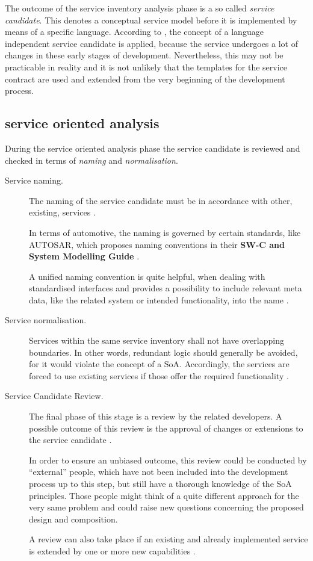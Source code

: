 The outcome of the service inventory analysis phase is a so called \emph{service candidate}. This denotes a conceptual service model before it is implemented by means of a specific language. According to \cite[p.42]{erl2011}, the concept of a language independent service candidate is applied, because the service undergoes a lot of changes in these early stages of development. Nevertheless, this may not be practicable in reality and it is not unlikely that the templates for the service contract are used and extended from the very beginning of the development process.

\subsection{service oriented analysis}

During the service oriented analysis phase the service candidate is reviewed and checked in terms of \emph{naming} and \emph{normalisation}.

\begin{description}
	\item [Service naming.]
	The naming of the service candidate must be in accordance with other, existing, services \cite[p.206]{erl2011}.

	In terms of automotive, the naming is governed by certain standards, like \mbox{AUTOSAR}, which proposes naming conventions in their \textbf{SW-C and System Modelling Guide} \cite{autosar_system_modelling}.

	A unified naming convention is quite helpful, when dealing with standardised interfaces and provides a possibility to include relevant meta data, like the related system or intended functionality, into the name \cite{rehner2013}.

	\item [Service normalisation.]
	Services within the same service inventory shall not have overlapping boundaries. In other words, redundant logic should generally be avoided, for it would violate the concept of a SoA. Accordingly, the services are forced to use existing services if those offer the required functionality \cite[p.207]{erl2011}.

	\item [Service Candidate Review.]
	The final phase of this stage is a review by the related developers. A possible outcome of this review is the approval of changes or extensions to the service candidate \cite[p.210]{erl2011}.

	In order to ensure an unbiased outcome, this review could be conducted by ``external'' people, which have not been included into the development process up to this step, but still have a thorough knowledge of the SoA principles. Those people might think of a quite different approach for the very same problem and could raise new questions concerning the proposed design and composition.

	A review can also take place if an existing and already implemented service is extended by one or more new capabilities \cite[p.210]{erl2011}.
\end{description}




